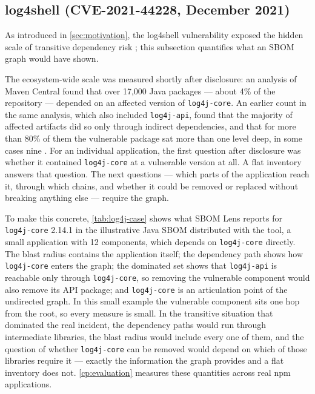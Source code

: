 \subsection{log4shell (CVE-2021-44228, December 2021)}
\label{sec:case-log4shell}

As introduced in \autoref{sec:motivation}, the log4shell vulnerability \citep{NIST_CVE_2021_44228} exposed the hidden scale of transitive dependency risk \citep{GoogleLog4j2021}; this subsection quantifies what an SBOM graph would have shown.

The ecosystem-wide scale was measured shortly after disclosure: an analysis of Maven Central found that over 17{,}000 Java packages --- about 4\% of the repository --- depended on an affected version of \texttt{log4j-core}. An earlier count in the same analysis, which also included \texttt{log4j-api}, found that the majority of affected artifacts did so only through indirect dependencies, and that for more than 80\% of them the vulnerable package sat more than one level deep, in some cases nine \citep{GoogleLog4j2021}. For an individual application, the first question after disclosure was whether it contained \texttt{log4j-core} at a vulnerable version at all. A flat inventory answers that question. The next questions --- which parts of the application reach it, through which chains, and whether it could be removed or replaced without breaking anything else --- require the graph.

To make this concrete, \autoref{tab:log4j-case} shows what SBOM Lens reports for \texttt{log4j-core} 2.14.1 in the illustrative Java SBOM distributed with the tool, a small application with 12 components, which depends on \texttt{log4j-core} directly. The blast radius contains the application itself; the dependency path shows how \texttt{log4j-core} enters the graph; the dominated set shows that \texttt{log4j-api} is reachable only through \texttt{log4j-core}, so removing the vulnerable component would also remove its API package; and \texttt{log4j-core} is an articulation point of the undirected graph. In this small example the vulnerable component sits one hop from the root, so every measure is small. In the transitive situation that dominated the real incident, the dependency paths would run through intermediate libraries, the blast radius would include every one of them, and the question of whether \texttt{log4j-core} can be removed would depend on which of those libraries require it --- exactly the information the graph provides and a flat inventory does not. \autoref{cp:evaluation} measures these quantities across real npm applications.

